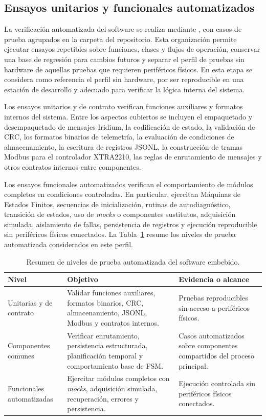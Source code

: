 \subsection{Ensayos unitarios y funcionales automatizados}

La verificación automatizada del software se realiza mediante \texttt{}, con casos de prueba agrupados en la carpeta \texttt{} del repositorio. Esta organización permite ejecutar ensayos repetibles sobre funciones, clases y flujos de operación, conservar una base de regresión para cambios futuros y separar el perfil de pruebas sin hardware de aquellas pruebas que requieren periféricos físicos. En esta etapa se considera como referencia el perfil sin hardware, por ser reproducible en una estación de desarrollo y adecuado para verificar la lógica interna del sistema.

Los ensayos unitarios y de contrato verifican funciones auxiliares y formatos internos del sistema. Entre los aspectos cubiertos se incluyen el empaquetado y desempaquetado de mensajes Iridium, la codificación de estado, la validación de CRC, los formatos binarios de telemetría, la evaluación de condiciones de almacenamiento, la escritura de registros JSONL, la construcción de tramas Modbus para el controlador XTRA2210, las reglas de enrutamiento de mensajes y otros contratos internos entre componentes.

Los ensayos funcionales automatizados verifican el comportamiento de módulos completos en condiciones controladas. En particular, ejercitan Máquinas de Estados Finitos, secuencias de inicialización, rutinas de autodiagnóstico, transición de estados, uso de \textit{mocks} o componentes sustitutos, adquisición simulada, aislamiento de fallas, persistencia de registros y ejecución reproducible sin periféricos físicos conectados. La Tabla~\ref{tab:niveles_prueba_automatizada} resume los niveles de prueba automatizada considerados en este perfil.

\begin{table}[htpb]
\centering
\small
\caption{Resumen de niveles de prueba automatizada del software embebido.}
\label{tab:niveles_prueba_automatizada}
\begin{tabularx}{\textwidth}{p{} X X}
\toprule
\textbf{Nivel} & \textbf{Objetivo} & \textbf{Evidencia o alcance} \\
\midrule
Unitarias y de contrato &
Validar funciones auxiliares, formatos binarios, CRC, almacenamiento, JSONL, Modbus y contratos internos. &
Pruebas reproducibles sin acceso a periféricos físicos. \\
\addlinespace
Componentes comunes &
Verificar enrutamiento, persistencia estructurada, planificación temporal y comportamiento base de FSM. &
Casos automatizados sobre componentes compartidos del proceso principal. \\
\addlinespace
Funcionales automatizadas &
Ejercitar módulos completos con \textit{mocks}, adquisición simulada, recuperación, errores y persistencia. &
Ejecución controlada sin periféricos físicos conectados. \\
\bottomrule
\end{tabularx}
\end{table}

